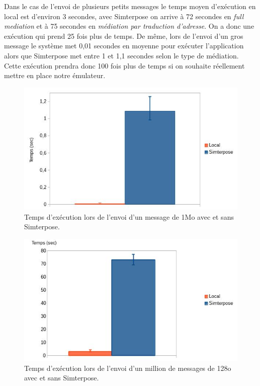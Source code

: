 Dans le cas de l'envoi de plusieurs petits messages le temps moyen d'exécution en local est d'environ 3 secondes, avec Simterpose on arrive à 72 secondes en \textit{full mediation} et à 75 secondes en \textit{médiation par traduction d'adresse}. On a donc une exécution qui prend 25 fois plus de temps. De même, lors de l'envoi d'un gros message le système met 0,01 secondes en moyenne pour exécuter l'application alors que Simterpose met entre 1 et 1,1 secondes selon le type de médiation. Cette exécution prendra donc 100 fois plus de temps si on souhaite réellement mettre en place notre émulateur.

\begin{figure}
  \centering
    \includegraphics[scale=0.5]{mesures/graph/Bigmsg_local.jpg}
    \caption{Temps d'exécution lors de l'envoi d'un message de 1Mo avec et sans Simterpose.}
    \label{Network_Big_Local}
\end{figure}

\begin{figure}
  \centering
    \includegraphics[scale=0.5]{mesures/graph/Littlemsg_local.jpg}
    \caption{Temps d'exécution lors de l'envoi d'un million de messages de 128o avec et sans Simterpose.}
    \label{Network_Little_Local}
\end{figure}
  

